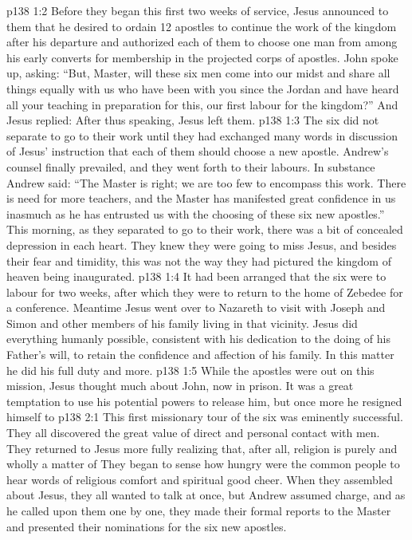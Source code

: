 \vs p138 1:2 Before they began this first two weeks of service, Jesus announced to them that he desired to ordain 12 apostles to continue the work of the kingdom after his departure and authorized each of them to choose one man from among his early converts for membership in the projected corps of apostles. John spoke up, asking: “But, Master, will these six men come into our midst and share all things equally with us who have been with you since the Jordan and have heard all your teaching in preparation for this, our first labour for the kingdom?” And Jesus replied:  After thus speaking, Jesus left them.
\vs p138 1:3 The six did not separate to go to their work until they had exchanged many words in discussion of Jesus’ instruction that each of them should choose a new apostle. Andrew’s counsel finally prevailed, and they went forth to their labours. In substance Andrew said: “The Master is right; we are too few to encompass this work. There is need for more teachers, and the Master has manifested great confidence in us inasmuch as he has entrusted us with the choosing of these six new apostles.” This morning, as they separated to go to their work, there was a bit of concealed depression in each heart. They knew they were going to miss Jesus, and besides their fear and timidity, this was not the way they had pictured the kingdom of heaven being inaugurated.
\vs p138 1:4 It had been arranged that the six were to labour for two weeks, after which they were to return to the home of Zebedee for a conference. Meantime Jesus went over to Nazareth to visit with Joseph and Simon and other members of his family living in that vicinity. Jesus did everything humanly possible, consistent with his dedication to the doing of his Father’s will, to retain the confidence and affection of his family. In this matter he did his full duty and more.
\vs p138 1:5 While the apostles were out on this mission, Jesus thought much about John, now in prison. It was a great temptation to use his potential powers to release him, but once more he resigned himself to 
\vs p138 2:1 This first missionary tour of the six was eminently successful. They all discovered the great value of direct and personal contact with men. They returned to Jesus more fully realizing that, after all, religion is purely and wholly a matter of  They began to sense how hungry were the common people to hear words of religious comfort and spiritual good cheer. When they assembled about Jesus, they all wanted to talk at once, but Andrew assumed charge, and as he called upon them one by one, they made their formal reports to the Master and presented their nominations for the six new apostles.
